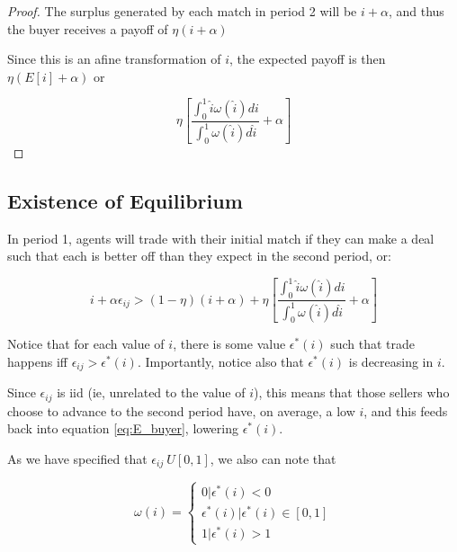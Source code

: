 \documentclass[WP]{AEA}
\begin{document}
\begin{proof}
	The surplus generated by each match in period 2 will be $i + \alpha$, and thus 
	the buyer receives a payoff of $\eta(i+\alpha)$
	
	Since this is an afine transformation of $i$, the expected payoff is then $\eta(E[i]+\alpha)$ or 



$$\eta \left[ \frac{\int_0^1 \hat{i} \omega(\hat{i}) di}{\int_0^1  \omega(\hat{i}) d\hat{i}} + \alpha \right] $$


\end{proof}


\subsection{Existence of Equilibrium}

In period 1, agents will trade with their initial match if they can make a deal such that each is better off than they expect in the second period, or:

\begin{equation} \label{eq:ec_condition_raw}
 i+\alpha \epsilon_{ij} >(1-\eta)(i+\alpha ) + \eta  \left[ \frac{\int_0^1 \hat{i} \omega(\hat{i}) di}{\int_0^1  \omega(\hat{i}) d\hat{i}} + \alpha \right] 
 \end{equation}

Notice that for each value of $i$, there is some value $\epsilon^* (i)$ such that trade happens iff $\epsilon_{ij} > \epsilon^* (i)$.  Importantly, notice also that $\epsilon^* (i)$ is decreasing in $i$.

Since $\epsilon_{ij}$ is iid (ie, unrelated to the value of $i$), this means that those sellers who choose to advance to the second period have, on average, a low $i$, and this feeds back into equation \ref{eq:E_buyer}, lowering  $\epsilon^* (i)$. 


As we have specified that $\epsilon_{ij} ~ U[0,1]$, we also can note that 

\begin{equation} \label{eq:omega_epsilon}
\omega(i) =
	\begin{cases}
		0 |  \epsilon^* (i) < 0 \\
		\epsilon^* (i) | \epsilon^* (i) \in [0,1] \\
		1 |  \epsilon^* (i) > 1
	\end{cases}
\end{equation}
\end{document}

